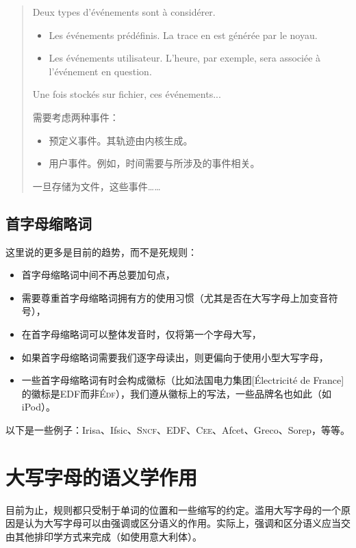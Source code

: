 \begin{quote}
    Deux types d'événements sont à considérer.
    \begin{itemize}
        \item Les événements prédéfinis. La trace en est générée par le noyau.
        \item Les événements utilisateur. L'heure, par exemple, sera associée à l'événement en question.
    \end{itemize}
    Une fois stockés sur fichier, ces événements...
    \begin{bil}
        需要考虑两种事件：
        \begin{itemize}
            \item 预定义事件。其轨迹由内核生成。
            \item 用户事件。例如，时间需要与所涉及的事件相关。
        \end{itemize}
        一旦存储为文件，这些事件……
    \end{bil}
\end{quote}

\subsection{首字母缩略词}

这里说的更多是目前的趋势，而不是死规则：

\begin{itemize}
    \item 首字母缩略词中间不再总要加句点，
    \item 需要尊重首字母缩略词拥有方的使用习惯（尤其是否在大写字母上加变音符号），
    \item 在首字母缩略词可以整体发音时，仅将第一个字母大写，
    \item 如果首字母缩略词需要我们逐字母读出，则更偏向于使用小型大写字母，
    \item 一些首字母缩略词有时会构成徽标（比如法国电力集团[Électricité de France]的徽标是EDF而非\textsc{Édf}），我们遵从徽标上的写法，一些品牌名也如此（如iPod）。
\end{itemize}

以下是一些例子：Irisa、Ifsic、\textsc{Sncf}、EDF、\textsc{Cee}、Afcet、Greco、Sorep，等等。

\section{大写字母的语义学作用}

目前为止，规则都只受制于单词的位置和一些缩写的约定。滥用大写字母的一个原因是认为大写字母可以由强调或区分语义的作用。实际上，强调和区分语义应当交由其他排印学方式来完成（如使用意大利体）。

